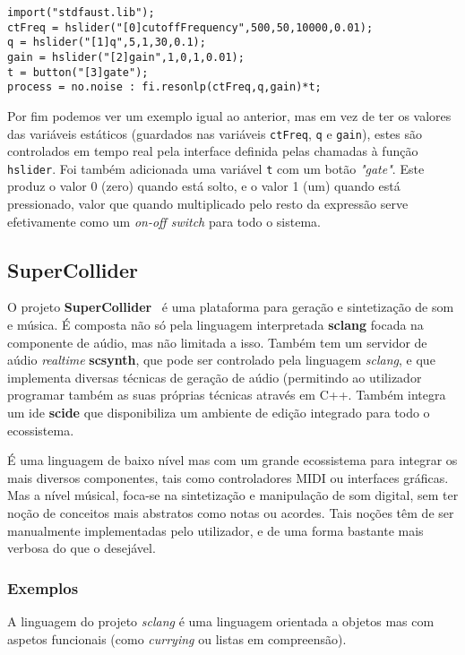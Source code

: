 \begin{lstlisting}[caption={Geração de ruído aleatório com um filtro \textit{low-pass} controlada por uma interface}]
import("stdfaust.lib");
ctFreq = hslider("[0]cutoffFrequency",500,50,10000,0.01);
q = hslider("[1]q",5,1,30,0.1);
gain = hslider("[2]gain",1,0,1,0.01);
t = button("[3]gate");
process = no.noise : fi.resonlp(ctFreq,q,gain)*t;
\end{lstlisting}
Por fim podemos ver um exemplo igual ao anterior, mas em vez de ter os valores das variáveis estáticos (guardados nas variáveis \texttt{ctFreq}, \texttt{q} e \texttt{gain}), estes são controlados em tempo real pela interface definida pelas chamadas à função \texttt{hslider}. Foi também adicionada uma variável \texttt{t} com um botão \textit{"gate"}. Este produz o valor 0 (zero) quando está solto, e o valor 1 (um) quando está pressionado, valor que quando multiplicado pelo resto da expressão serve efetivamente como um \textit{on-off switch} para todo o sistema.

\subsection{SuperCollider}
O projeto \textbf{SuperCollider}~\cite{doi:SuperCollider} é uma plataforma para geração e sintetização de som e música. É composta não só pela linguagem interpretada \textbf{sclang} focada na componente de aúdio, mas não limitada a isso. Também tem um servidor de aúdio \textit{realtime} \textbf{scsynth}, que pode ser controlado pela linguagem \textit{sclang}, e que implementa diversas técnicas de geração de aúdio (permitindo ao utilizador programar também as suas próprias técnicas através em C++. Também integra um \acrshort{ide} \textbf{scide} que disponibiliza um ambiente de edição integrado para todo o ecossistema.

É uma linguagem de baixo nível mas com um grande ecossistema para integrar os mais diversos componentes, tais como controladores MIDI ou interfaces gráficas. Mas a nível músical, foca-se na sintetização e manipulação de som digital, sem ter noção de conceitos mais abstratos como notas ou acordes. Tais noções têm de ser manualmente implementadas pelo utilizador, e de uma forma bastante mais verbosa do que o desejável.

\subsubsection{Exemplos}
A linguagem do projeto \textit{sclang} é uma linguagem orientada a objetos mas com aspetos funcionais (como \textit{currying} ou listas em compreensão).

